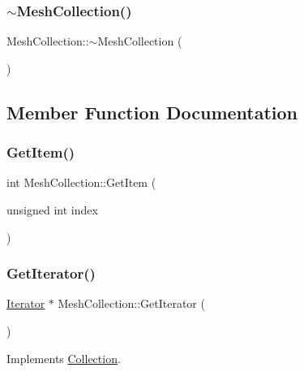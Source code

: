 \subsubsection{\texorpdfstring{$\sim$MeshCollection()}{~MeshCollection()}}
{\footnotesize\ttfamily Mesh\+Collection\+::$\sim$\+Mesh\+Collection (\begin{DoxyParamCaption}{ }\end{DoxyParamCaption})\hspace{0.3cm}{\ttfamily [override]}}



\subsection{Member Function Documentation}
\mbox{\label{class_mesh_collection_a7e13df76bc1c8f2d68b7b023a0236eab}} 
\subsubsection{\texorpdfstring{GetItem()}{GetItem()}}
{\footnotesize\ttfamily int Mesh\+Collection\+::\+Get\+Item (\begin{DoxyParamCaption}\item[{unsigned int}]{index }\end{DoxyParamCaption})}

\mbox{\label{class_mesh_collection_ac0a6c3c91ed15c06292d5e659f8259ae}} 
\subsubsection{\texorpdfstring{GetIterator()}{GetIterator()}}
{\footnotesize\ttfamily \mbox{\hyperlink{class_iterator}{Iterator}} $\ast$ Mesh\+Collection\+::\+Get\+Iterator (\begin{DoxyParamCaption}{ }\end{DoxyParamCaption})\hspace{0.3cm}{\ttfamily [virtual]}}



Implements \mbox{\hyperlink{class_collection_a3f973deaf28b8c098f3bcbe9737b9780}{Collection}}.

